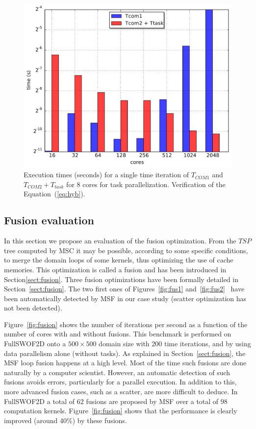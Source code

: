 \begin{figure}[!h]\begin{center}
  \includegraphics[width=.6\textwidth]{../results/task_scaling/500_200/analytic/tth.pdf}
  \caption{Execution times (seconds) for a single time iteration of $T_{COM1}$ and $T_{COM2} + T_{task}$ for 8 cores for task parallelization. Verification of the Equation~(\ref{eq:hyb}).}
  \label{fig:tth2}
\end{center}\end{figure}

\subsection{Fusion evaluation}
\label{sect:fus}

In this section we propose an evaluation of the fusion optimization. From the $TSP$ tree computed by MSC it may be possible, according to some specific conditions, to merge the domain loops of some kernels, thus optimizing the use of cache memories. This optimization is called a fusion and has been introduced in Section\ref{sect:fusion}. Three fusion optimizations
%
have been formally detailed in Section~\ref{sect:fusion}. The two first ones of Figures~\ref{fig:fus1} and~\ref{fig:fus2}~ have been automatically detected by MSF in our case study (\ie scatter optimization has not been detected).

Figure~\ref{fig:fusion} shows the number of iterations per second as a function of the number of cores with and without fusions. This benchmark is performed on FullSWOF2D onto a $500 \times 500$ domain size with $200$ time iterations, and by using data parallelism alone (without tasks). As explained in Section~\ref{sect:fusion}, the MSF loop fusion happens at a high level. Most of the time such fusions are done naturally by a computer scientist. However, an automatic detection of such fusions avoids errors, particularly for a parallel execution. In addition to this, more advanced fusion cases, such as a scatter, are more difficult to deduce. In FullSWOF2D a total of  62 fusions are proposed by MSF over a total of 98 computation kernels. Figure~\ref{fig:fusion} shows that the performance is clearly improved (around 40\%) by these fusions.

